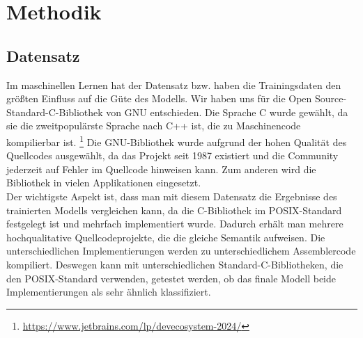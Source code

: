 \documentclass[12pt,letterpaper,ngerman]{article}
\begin{document}
\pagebreak
\section{Methodik}
\subsection{Datensatz}
Im maschinellen Lernen hat der Datensatz bzw. haben die
Trainingsdaten
den größten Einfluss auf die Güte des Modells. Wir haben uns 
für die Open Source-Standard-C-Bibliothek von GNU entschieden. 
Die Sprache C wurde gewählt, da sie die zweitpopulärste Sprache 
nach C++ ist, die zu Maschinencode kompilierbar ist.
\footnote{\url{https://www.jetbrains.com/lp/devecosystem-2024/}}
Die GNU-Bibliothek wurde aufgrund der hohen Qualität des 
Quellcodes ausgewählt, da das Projekt seit 1987 existiert 
und die Community jederzeit auf Fehler im Quellcode hinweisen kann.
Zum anderen wird die Bibliothek in vielen Applikationen 
eingesetzt.\\
Der wichtigste Aspekt ist, dass man mit diesem Datensatz 
die Ergebnisse des trainierten Modells vergleichen kann, da die 
C-Bibliothek im POSIX-Standard festgelegt ist und mehrfach 
implementiert wurde. Dadurch erhält man mehrere hochqualitative 
Quellcodeprojekte, die die gleiche Semantik aufweisen. Die 
unterschiedlichen Implementierungen werden zu unterschiedlichem 
Assemblercode kompiliert. Deswegen kann mit unterschiedlichen 
Standard-C-Bibliotheken, die den POSIX-Standard verwenden,
getestet werden, ob das finale Modell beide Implementierungen 
als sehr ähnlich klassifiziert.

\end{document}

